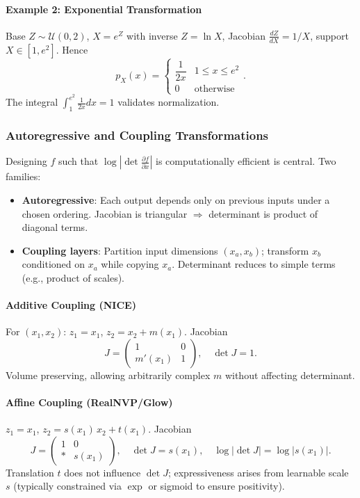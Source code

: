 \documentclass[conference]{IEEEtran}
\begin{document}
\paragraph{Example 2: Exponential Transformation}
Base $Z \sim \mathcal{U}(0,2)$, $X = e^{Z}$ with inverse $Z = \ln X$, Jacobian $\frac{dZ}{dX}=1/X$, support $X \in [1,e^{2}]$. Hence
\begin{equation}
 p_X(x) = \begin{cases}\dfrac{1}{2x} & 1 \le x \le e^{2} \\ 0 & \text{otherwise}\end{cases}.
\end{equation}
The integral $\int_{1}^{e^{2}} \frac{1}{2x} dx = 1$ validates normalization.

\subsubsection{Autoregressive and Coupling Transformations}
Designing $f$ such that $\log \left| \det \frac{\partial f}{\partial x} \right|$ is computationally efficient is central. Two families:
\begin{itemize}
 \item \textbf{Autoregressive}: Each output depends only on previous inputs under a chosen ordering. Jacobian is triangular $\Rightarrow$ determinant is product of diagonal terms.
 \item \textbf{Coupling layers}: Partition input dimensions $(x_a, x_b)$; transform $x_b$ conditioned on $x_a$ while copying $x_a$. Determinant reduces to simple terms (e.g., product of scales).
\end{itemize}

\paragraph{Additive Coupling (NICE)} For $(x_1,x_2)$: $z_1 = x_1$, $z_2 = x_2 + m(x_1)$. Jacobian
\begin{equation}
 J = \begin{pmatrix}1 & 0 \\ m'(x_1) & 1\end{pmatrix},\quad \det J = 1.
\end{equation}
Volume preserving, allowing arbitrarily complex $m$ without affecting determinant.

\paragraph{Affine Coupling (RealNVP/Glow)} $z_1 = x_1$, $z_2 = s(x_1)\, x_2 + t(x_1)$. Jacobian
\begin{equation}
 J = \begin{pmatrix}1 & 0 \\ * & s(x_1)\end{pmatrix},\quad \det J = s(x_1),\quad \log |\det J| = \log |s(x_1)|.
\end{equation}
Translation $t$ does not influence $\det J$; expressiveness arises from learnable scale $s$ (typically constrained via $\exp$ or sigmoid to ensure positivity).
\end{document}
